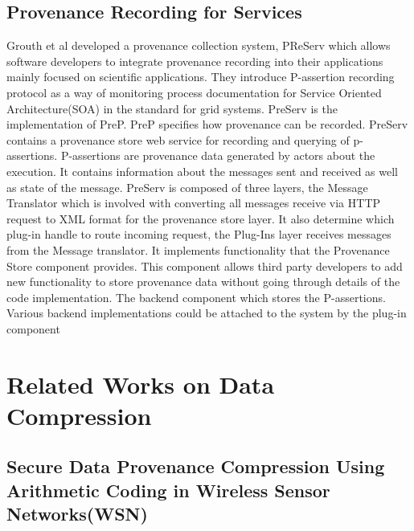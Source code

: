 \subsection{Provenance Recording for Services}
Grouth et al \cite{groth} developed a provenance collection system, PReServ which allows software developers to integrate provenance recording into their applications mainly focused on scientific applications. They introduce P-assertion recording protocol as a way of monitoring process  documentation for Service Oriented Architecture(SOA) in the standard for grid systems. PreServ is the implementation of PreP. PreP specifies how provenance can be recorded. PreServ contains a provenance store web service for recording and querying of p-assertions. P-assertions are provenance data generated by actors about the execution. It contains information about the messages sent and received as well as state of the message. PreServ is composed of three layers, the Message Translator which is involved with converting all messages receive via HTTP request to XML format for the provenance store layer. It also determine which plug-in handle to route incoming request, the  Plug-Ins layer receives messages from the Message translator. It implements functionality that the Provenance Store component provides. This component allows third party developers to add new functionality to store provenance data without going through details of the code implementation. The backend component which stores the P-assertions. Various backend implementations could be attached to the system by the plug-in component



\section{Related Works on Data Compression}

\subsection{Secure Data Provenance Compression Using Arithmetic Coding in Wireless Sensor Networks(WSN)}

